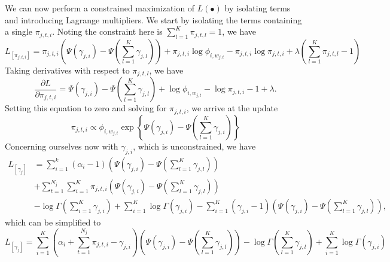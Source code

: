 \documentclass[11pt]{article}
\begin{document}
We can now perform a constrained maximization of $L(\bullet)$ by isolating
terms and introducing Lagrange multipliers. We start by isolating the
terms containing a single $\pi_{j,t,i}$. Noting the constraint here is
$\sum_{l = 1}^K \pi_{j,t,l} = 1$, we have
\begin{equation}
  L_{[\pi_{j,t,i}]}
  =
  \pi_{j,t,i}\left(
    \Psi(\gamma_{j,i}) - \Psi\left(\sum_{l=1}^K \gamma_{j,l}\right)
  \right)
  +
  \pi_{j,t,i} \log \phi_{i,w_{j,t}}
  -
  \pi_{j,t,i} \log \pi_{j,t,i}
  +
  \lambda \left(\sum_{l=1}^K \pi_{j,t,l} - 1\right)
\end{equation}
Taking derivatives with respect to $\pi_{j,t,l}$, we have
\begin{equation}
  \frac{\partial L}{\partial \pi_{j,t,i}}
  = \Psi(\gamma_{j,i}) - \Psi\left(\sum_{l=1}^K \gamma_{j,l}\right)
  + \log \phi_{i,w_{j,t}}
  - \log \pi_{j,t,i} - 1
  + \lambda.
\end{equation}
Setting this equation to zero and solving for $\pi_{j,t,i}$, we arrive at
the update
\begin{equation}
  \pi_{j,t,i}
  \propto
  \phi_{i,w_{j,t}}
  \exp\left\{
    \Psi(\gamma_{j,i}) - \Psi\left(\sum_{l=1}^K \gamma_{j,i}\right)
  \right\}
\end{equation}
Concerning ourselves now with $\gamma_{j,i}$, which is unconstrained, we have
\begin{equation}
  \begin{split}
    L_{[\gamma_j]}
    &=
    \sum_{i=1}^k (\alpha_i - 1)
    \left(\Psi(\gamma_{j,i}) - \Psi\left(\sum_{l=1}^K \gamma_{j,l}\right)\right)
    \\&+
    \sum_{t=1}^{N_j} \sum_{i=1}^K \pi_{j,t,i}
    \left(\Psi(\gamma_{j,i}) - \Psi\left(\sum_{l=1}^K \gamma_{j,l}\right)\right)
    \\&-
    \log \Gamma\left(\sum_{i=1}^K \gamma_{j,i}\right)
    + \sum_{i=1}^K \log \Gamma(\gamma_{j,i})
    - \sum_{i=1}^K (\gamma_{j,i} - 1)
    \left(\Psi(\gamma_{j,i}) - \Psi\left(\sum_{l=1}^K
    \gamma_{j,l}\right)\right),
  \end{split}
\end{equation}
which can be simplified to
\begin{equation}
  L_{[\gamma_j]}
  =
  \sum_{i=1}^K \left(\alpha_i + \sum_{t=1}^{N_j} \pi_{j,t,i} -
    \gamma_{j,i}\right)
  \left(
    \Psi(\gamma_{j,i}) - \Psi\left(\sum_{l=1}^K \gamma_{j,l}\right)
  \right)
  - \log \Gamma\left(\sum_{l=1}^K \gamma_{j,l}\right)
  + \sum_{i=1}^K \log \Gamma(\gamma_{j,i})
\end{equation}
\end{document}
